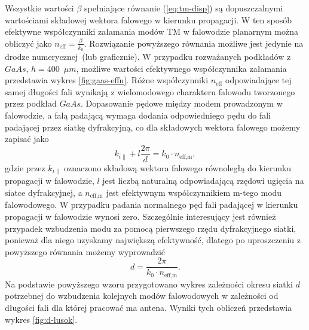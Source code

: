 Wszystkie wartości $\beta$ spełniające  równanie (\ref{eq:tm-disp}) są dopuszczalnymi wartościami składowej wektora falowego w kierunku propagacji. W ten sposób efektywne współczynniki załamania modów TM w falowodzie planarnym można obliczyć jako $n_{\textrm{eff}}=\frac{\beta}{k_0}$. Rozwiązanie powyższego równania możliwe jest jedynie na drodze numerycznej~(lub graficznie). W przypadku rozważanych podkładów z $GaAs$, $h=400$~$\mu m$, możliwe wartości efektywnego współczynnika załamania przedstawia wykres \ref{fig:gaas-effn}. Różne współczynniki $n_{\textrm{eff}}$ odpowiadające tej samej długości fali wynikają z wielomodowego charakteru falowodu tworzonego przez podkład $GaAs$. Dopasowanie pędowe między modem prowadzonym w falowodzie, a falą padającą wymaga dodania odpowiedniego pędu do fali padającej przez siatkę dyfrakcyjną, co dla składowych wektora falowego możemy zapisać jako
\[
k_{i \parallel} + l \frac{2\pi}{d} = k_0 \cdot n_{\textrm{eff,m}}, 
\]
gdzie przez $k_{i \parallel}$ oznaczono składową wektora falowego równoległą do kierunku propagacji w falowodzie, $l$ jest liczbą naturalną odpowiadającą rzędowi ugięcia na siatce dyfrakcyjnej, a $n_{\textrm{eff,m}}$ jest efektywnym współczynnikiem m-tego modu falowodowego. W przypadku padania normalnego pęd fali padającej w kierunku propagacji w falowodzie wynosi zero. Szczególnie interesujący jest również przypadek wzbudzenia modu za pomocą pierwszego rzędu dyfrakcyjnego siatki, ponieważ dla niego uzyskamy największą efektywność, dlatego po uproszczeniu z powyższego równania możemy wyprowadzić
\begin{equation}
d=\frac{2 \pi}{k_0 \cdot n_{\textrm{eff,m}}}.
\label{eq:d-do-wzbudzenia}
\end{equation}
Na podstawie powyższego wzoru przygotowano wykres zależności okresu siatki $d$ potrzebnej do wzbudzenia kolejnych modów falowodowych w zależności od długości fali dla której pracować ma antena. Wyniki tych obliczeń przedstawia wykres \ref{fig:d-lusok}.

